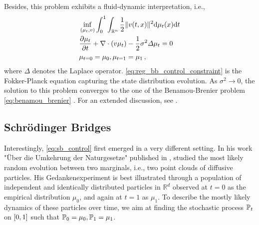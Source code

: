Besides, this problem exhibits a fluid-dynamic interpretation, i.e.,
\begin{align}
	& \inf _{(\mu_t, v)} \int_0^1 \int_{\mathbb{R}^n}\frac{1}{2}\lVert v(t, x)\rVert^2 \mathrm{d}\mu_t(x) \mathrm{d} t \\
	\label{eq:reg_bb_control_constraint} & \frac{\partial \mu_t}{\partial t}+\nabla \cdot(v \mu_t) - \frac{1}{2}\sigma^2 \Delta \mu_t = 0 \\
	& \nonumber \mu_{t=0}=\mu_0, \mu_{t=1}=\mu_1\,,
\end{align}
where $\Delta$ denotes the Laplace operator.
\eqref{eq:reg_bb_control_constraint} is the Fokker-Planck equation capturing the state distribution evolution.
As $\sigma^2 \rightarrow 0$, the solution to this problem converges to the one of the Benamou-Brenier problem \eqref{eq:benamou_brenier} \citep{mikami2008optimal}.
For an extended discussion, see \citet{dai1991stochastic, mikami2000dynamical, mikami2002optimal}.


\subsection{Schr{\"o}dinger Bridges} \label{sec:background_sb}

Interestingly, \cref{eq:sb_control} first emerged in a very different setting.
In his work "{\"U}ber die Umkehrung der Naturgesetze" published in \citeyear{schrodinger1931umkehrung}, \citeauthor{schrodinger1931umkehrung} studied the most likely random evolution between two marginals, i.e., two point clouds of diffusive particles.
His Gedankenexperiment is best illustrated through a population of independent and identically distributed particles in $\mathbb{R}^d$ observed at $t=0$ as the empirical distribution $\mu_0$, and again at $t=1$ as $\mu_1$.
To describe the mostly likely dynamics of these particles over time, we aim at finding the stochastic process $\mathbb{P}_{{t}}$ on $[0,1]$ such that $\mathbb{P}_{{0}} = \mu_0, \mathbb{P}_{{1}} = \mu_1$.

